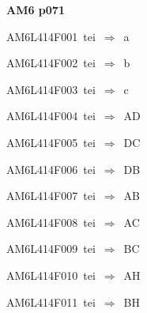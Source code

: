 \par\vfill\eject
{\bf\hfill AM6 p071\hfill\hbox{}}\par\bigskip
{\sixrm AM6L414F001\ {\sixit tei}\ }$\Rightarrow$\ {\tenit a}\par\smallskip
{\sixrm AM6L414F002\ {\sixit tei}\ }$\Rightarrow$\ {\tenit b}\par\smallskip
{\sixrm AM6L414F003\ {\sixit tei}\ }$\Rightarrow$\ {\tenit c}\par\smallskip
{\sixrm AM6L414F004\ {\sixit tei}\ }$\Rightarrow$\ AD\par\smallskip
{\sixrm AM6L414F005\ {\sixit tei}\ }$\Rightarrow$\ DC\par\smallskip
{\sixrm AM6L414F006\ {\sixit tei}\ }$\Rightarrow$\ DB\par\smallskip
{\sixrm AM6L414F007\ {\sixit tei}\ }$\Rightarrow$\ AB\par\smallskip
{\sixrm AM6L414F008\ {\sixit tei}\ }$\Rightarrow$\ AC\par\smallskip
{\sixrm AM6L414F009\ {\sixit tei}\ }$\Rightarrow$\ BC\par\smallskip
{\sixrm AM6L414F010\ {\sixit tei}\ }$\Rightarrow$\ AH\par\smallskip
{\sixrm AM6L414F011\ {\sixit tei}\ }$\Rightarrow$\ BH\par\smallskip

